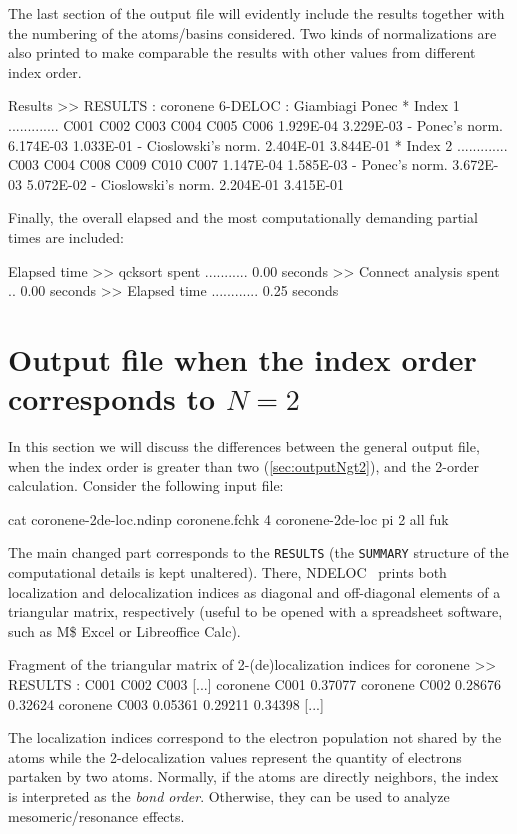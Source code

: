 \documentclass[a4paper,11pt,openany]{memoir}
\newcommand\programa{\textsc{NDELOC}}
\begin{document}
The last section of the output file will evidently include the results together with the numbering of the atoms/basins considered. Two kinds of normalizations are also printed to make comparable the results with other values from different index order.
\begin{recuadro}{Results}
>> RESULTS :
coronene 6-DELOC :                                        Giambiagi      Ponec
* Index   1 ............. C001 C002 C003 C004 C005 C006   1.929E-04  3.229E-03
-        Ponec's norm.                                    6.174E-03  1.033E-01
- Cioslowski's norm.                                      2.404E-01  3.844E-01
* Index   2 ............. C003 C004 C008 C009 C010 C007   1.147E-04  1.585E-03
-      Ponec's norm.                                      3.672E-03  5.072E-02
- Cioslowski's norm.                                      2.204E-01  3.415E-01
\end{recuadro}

Finally, the overall elapsed and the most computationally demanding partial times are included:
\begin{recuadro}{Elapsed time}
>> qcksort spent ........... 0.00 seconds
>> Connect analysis spent .. 0.00 seconds
>> Elapsed time ............ 0.25 seconds
\end{recuadro}

\section{Output file when the index order corresponds to $N=2$}\label{sec:outputNeq2}
In this section we will discuss the differences between the general output file, when the index order is greater than two (\autoref{sec:outputNgt2}), and the 2-order calculation. Consider the following input file:
\begin{consola}{cat coronene-2de-loc.ndinp}
coronene.fchk 4
coronene-2de-loc
pi
2
all
fuk
\end{consola}
The main changed part corresponds to the {\texttt{RESULTS}} (the \texttt{SUMMARY} structure of the computational details is kept unaltered). There, \programa~ prints
 both localization and delocalization indices as diagonal and off-diagonal elements of a triangular matrix, respectively (useful to be opened with a spreadsheet software, such as M\$ Excel or Libreoffice Calc).
\begin{recuadro}{Fragment of the triangular matrix of 2-(de)localization indices for coronene}
>> RESULTS :
                   C001       C002       C003       [...]
coronene  C001     0.37077
coronene  C002     0.28676    0.32624
coronene  C003     0.05361    0.29211    0.34398
[...]
\end{recuadro}
The localization indices correspond to the electron population not shared by the atoms while the 2-delocalization values represent the quantity of electrons partaken by two atoms. Normally, if the atoms are directly neighbors, the index is interpreted as the \emph{bond order}. Otherwise, they can be used to analyze mesomeric/resonance effects.
\end{document}
